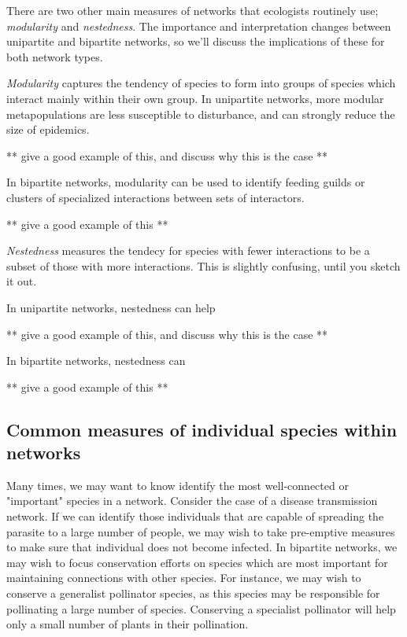 \documentclass[12pt]{article}
\begin{document}
There are two other main measures of networks that ecologists routinely use; \textit{modularity} and \textit{nestedness}. The importance and interpretation changes between unipartite and bipartite networks, so we'll discuss the implications of these for both network types.



\textit{Modularity} captures the tendency of species to form into groups of species which interact mainly within their own group. In unipartite networks, more modular metapopulations are less susceptible to disturbance, and can strongly reduce the size of epidemics. 

** give a good example of this, and discuss why this is the case **

In bipartite networks, modularity can be used to identify feeding guilds or clusters of specialized interactions between sets of interactors.

** give a good example of this **









\textit{Nestedness} measures the tendecy for species with fewer interactions to be a subset of those with more interactions. This is slightly confusing, until you sketch it out. 


In unipartite networks, nestedness can help

** give a good example of this, and discuss why this is the case **



In bipartite networks, nestedness can 

** give a good example of this **












\bigskip
\subsection*{Common measures of individual species within networks}

Many times, we may want to know identify the most well-connected or "important" species in a network. Consider the case of a disease transmission network. If we can identify those individuals that are capable of spreading the parasite to a large number of people, we may wish to take pre-emptive measures to make sure that individual does not become infected. In bipartite networks, we may wish to focus conservation efforts on species which are most important for maintaining connections with other species. For instance, we may wish to conserve a generalist pollinator species, as this species may be responsible for pollinating a large number of species. Conserving a specialist pollinator will help only a small number of plants in their pollination. 
\end{document}
